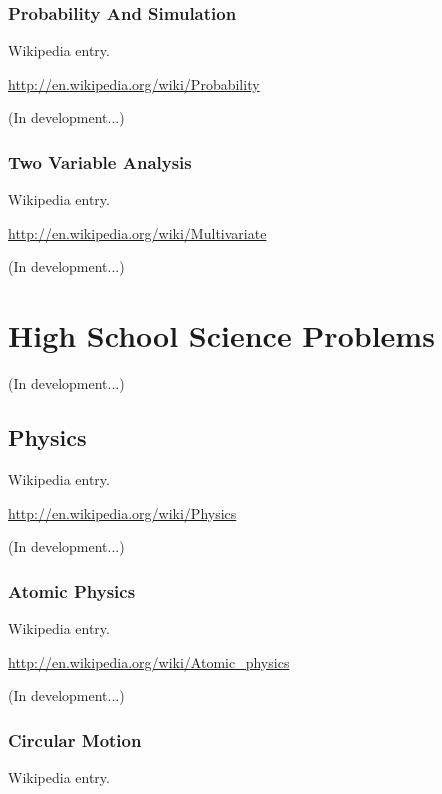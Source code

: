 \documentclass[12pt,oneside]{book}
\begin{document}
\subsection[Probability And Simulation]{Probability And Simulation}

Wikipedia entry.

\href{http://en.wikipedia.org/wiki/Probability}{http://en.wikipedia.org/wiki/Probability}

(In development...)

\subsection[Two Variable Analysis]{Two Variable Analysis}

Wikipedia entry.

\href{http://en.wikipedia.org/wiki/Multivariate}{http://en.wikipedia.org/wiki/Multivariate}

(In development...)

\chapter[High School Science Problems]{High School Science Problems}

(In development...)

\section[Physics]{Physics}

Wikipedia entry.

\href{http://en.wikipedia.org/wiki/Physics}{http://en.wikipedia.org/wiki/Physics}

(In development...)

\subsection[Atomic Physics]{Atomic Physics}

Wikipedia entry.

\href{http://en.wikipedia.org/wiki/Atomic_physics}{http://en.wikipedia.org/wiki/Atomic\_physics}

(In development...)

\subsection[Circular Motion]{Circular Motion}

Wikipedia entry.
\end{document}
